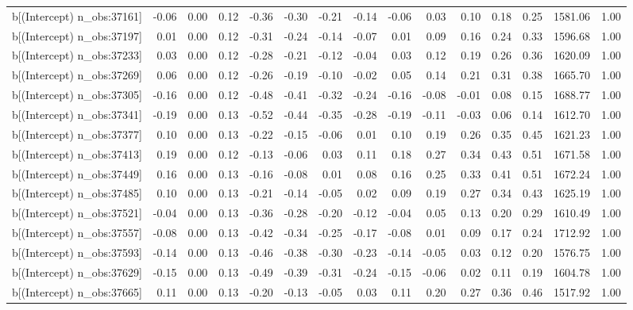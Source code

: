 \begin{table}[ht]
\begin{tabular}{rrrrrrrrrrrrrrr}
  b[(Intercept) n\_obs:37161] & -0.06 & 0.00 & 0.12 & -0.36 & -0.30 & -0.21 & -0.14 & -0.06 & 0.03 & 0.10 & 0.18 & 0.25 & 1581.06 & 1.00 \\ 
  b[(Intercept) n\_obs:37197] & 0.01 & 0.00 & 0.12 & -0.31 & -0.24 & -0.14 & -0.07 & 0.01 & 0.09 & 0.16 & 0.24 & 0.33 & 1596.68 & 1.00 \\ 
  b[(Intercept) n\_obs:37233] & 0.03 & 0.00 & 0.12 & -0.28 & -0.21 & -0.12 & -0.04 & 0.03 & 0.12 & 0.19 & 0.26 & 0.36 & 1620.09 & 1.00 \\ 
  b[(Intercept) n\_obs:37269] & 0.06 & 0.00 & 0.12 & -0.26 & -0.19 & -0.10 & -0.02 & 0.05 & 0.14 & 0.21 & 0.31 & 0.38 & 1665.70 & 1.00 \\ 
  b[(Intercept) n\_obs:37305] & -0.16 & 0.00 & 0.12 & -0.48 & -0.41 & -0.32 & -0.24 & -0.16 & -0.08 & -0.01 & 0.08 & 0.15 & 1688.77 & 1.00 \\ 
  b[(Intercept) n\_obs:37341] & -0.19 & 0.00 & 0.13 & -0.52 & -0.44 & -0.35 & -0.28 & -0.19 & -0.11 & -0.03 & 0.06 & 0.14 & 1612.70 & 1.00 \\ 
  b[(Intercept) n\_obs:37377] & 0.10 & 0.00 & 0.13 & -0.22 & -0.15 & -0.06 & 0.01 & 0.10 & 0.19 & 0.26 & 0.35 & 0.45 & 1621.23 & 1.00 \\ 
  b[(Intercept) n\_obs:37413] & 0.19 & 0.00 & 0.12 & -0.13 & -0.06 & 0.03 & 0.11 & 0.18 & 0.27 & 0.34 & 0.43 & 0.51 & 1671.58 & 1.00 \\ 
  b[(Intercept) n\_obs:37449] & 0.16 & 0.00 & 0.13 & -0.16 & -0.08 & 0.01 & 0.08 & 0.16 & 0.25 & 0.33 & 0.41 & 0.51 & 1672.24 & 1.00 \\ 
  b[(Intercept) n\_obs:37485] & 0.10 & 0.00 & 0.13 & -0.21 & -0.14 & -0.05 & 0.02 & 0.09 & 0.19 & 0.27 & 0.34 & 0.43 & 1625.19 & 1.00 \\ 
  b[(Intercept) n\_obs:37521] & -0.04 & 0.00 & 0.13 & -0.36 & -0.28 & -0.20 & -0.12 & -0.04 & 0.05 & 0.13 & 0.20 & 0.29 & 1610.49 & 1.00 \\ 
  b[(Intercept) n\_obs:37557] & -0.08 & 0.00 & 0.13 & -0.42 & -0.34 & -0.25 & -0.17 & -0.08 & 0.01 & 0.09 & 0.17 & 0.24 & 1712.92 & 1.00 \\ 
  b[(Intercept) n\_obs:37593] & -0.14 & 0.00 & 0.13 & -0.46 & -0.38 & -0.30 & -0.23 & -0.14 & -0.05 & 0.03 & 0.12 & 0.20 & 1576.75 & 1.00 \\ 
  b[(Intercept) n\_obs:37629] & -0.15 & 0.00 & 0.13 & -0.49 & -0.39 & -0.31 & -0.24 & -0.15 & -0.06 & 0.02 & 0.11 & 0.19 & 1604.78 & 1.00 \\ 
  b[(Intercept) n\_obs:37665] & 0.11 & 0.00 & 0.13 & -0.20 & -0.13 & -0.05 & 0.03 & 0.11 & 0.20 & 0.27 & 0.36 & 0.46 & 1517.92 & 1.00 \\ 

\end{tabular}
\end{table}
